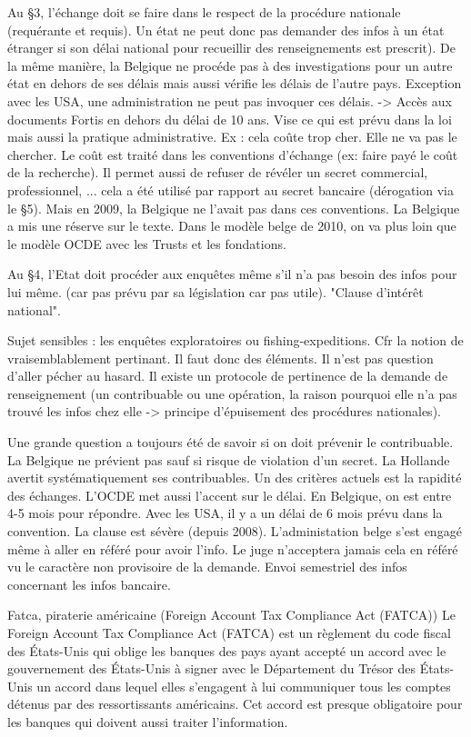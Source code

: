 \documentclass{book}
\begin{document}
Au §3, l'échange doit se faire dans le respect de la procédure nationale (requérante et requis). Un état ne peut donc pas demander des infos à un état étranger si son délai national pour recueillir des renseignements est prescrit). De la même manière, la Belgique ne procéde pas à des investigations pour un autre état en dehors de ses délais mais aussi vérifie les délais de l'autre pays. Exception avec les USA, une administration ne peut pas invoquer ces délais. -> Accès aux documents Fortis en dehors du délai de 10 ans. Vise ce qui est prévu dans la loi mais aussi la pratique administrative. Ex : cela coûte trop cher. Elle ne va pas le chercher. Le coût est traité dans les conventions d'échange (ex: faire payé le coût de la recherche). Il permet aussi de refuser de révéler un secret commercial, professionnel, ... cela a été utilisé par rapport au secret bancaire (dérogation via le §5). Mais en 2009, la Belgique ne l'avait pas dans ces conventions. La Belgique a mis une réserve sur le texte. Dans le modèle belge de 2010, on va plus loin que le modèle OCDE avec les Trusts et les fondations.


Au §4, l'Etat doit procéder aux enquêtes même s'il n'a pas besoin des infos pour lui même. (car pas prévu par sa législation car pas utile). "Clause d'intérêt national".

Sujet sensibles : les enquêtes exploratoires ou fishing-expeditions. Cfr la notion de vraisemblablement pertinant. Il faut donc des éléments. Il n'est pas question d'aller pécher au hasard. Il existe un protocole de pertinence de la demande de renseignement (un contribuable ou une opération, la raison pourquoi elle n'a pas trouvé les infos chez elle -> principe d'épuisement des procédures nationales). 

Une grande question a toujours été de savoir si on doit prévenir le contribuable. La Belgique ne prévient pas sauf si risque de violation d'un secret. La Hollande avertit systématiquement ses contribuables. Un des critères actuels est la rapidité des échanges. L'OCDE met aussi l'accent sur le délai. En Belgique, on est entre 4-5 mois pour répondre. Avec les USA, il y a un délai de 6 mois prévu dans la convention. La clause est sévère (depuis 2008). L'administation belge s'est engagé même à aller en référé pour avoir l'info. Le juge n'acceptera jamais cela en référé vu le caractère non provisoire de la demande. Envoi semestriel des infos concernant les infos bancaire.

Fatca, piraterie américaine (Foreign Account Tax Compliance Act (FATCA)) Le Foreign Account Tax Compliance Act (FATCA) est un règlement du code fiscal des États-Unis qui oblige les banques des pays ayant accepté un accord avec le gouvernement des États-Unis à signer avec le Département du Trésor des États-Unis un accord dans lequel elles s'engagent à lui communiquer tous les comptes détenus par des ressortissants américains. Cet accord est presque obligatoire pour les banques qui doivent aussi traiter l'information.
\end{document}
